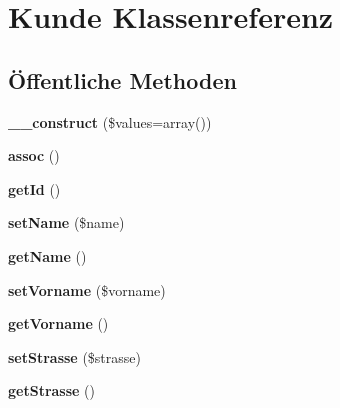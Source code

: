 \hypertarget{classKunde}{\section{\-Kunde \-Klassenreferenz}
\label{classKunde}
}
\subsection*{Öffentliche \-Methoden}
\begin{DoxyCompactItemize}
\item 
\hypertarget{classKunde_ad79f2bdfaefd3925e5f9a06806873223}{{\bfseries \-\_\-\-\_\-construct} (\$values=array())}\label{classKunde_ad79f2bdfaefd3925e5f9a06806873223}

\item 
\hypertarget{classKunde_ad0f0c5c3e3f969484954780af94cedc2}{{\bfseries assoc} ()}\label{classKunde_ad0f0c5c3e3f969484954780af94cedc2}

\item 
\hypertarget{classKunde_a64c93a2695191e9b83aa583d909f89fd}{{\bfseries get\-Id} ()}\label{classKunde_a64c93a2695191e9b83aa583d909f89fd}

\item 
\hypertarget{classKunde_a02d8c41eef3f45e88e873eea36b198e6}{{\bfseries set\-Name} (\$name)}\label{classKunde_a02d8c41eef3f45e88e873eea36b198e6}

\item 
\hypertarget{classKunde_a69a219e35fc80e6a5c2f04fc5e864bdb}{{\bfseries get\-Name} ()}\label{classKunde_a69a219e35fc80e6a5c2f04fc5e864bdb}

\item 
\hypertarget{classKunde_aca1e9d8678ff2ed0bcb1ca192facf41e}{{\bfseries set\-Vorname} (\$vorname)}\label{classKunde_aca1e9d8678ff2ed0bcb1ca192facf41e}

\item 
\hypertarget{classKunde_a6bcdc943abc51661e3a6c035f77bac0b}{{\bfseries get\-Vorname} ()}\label{classKunde_a6bcdc943abc51661e3a6c035f77bac0b}

\item 
\hypertarget{classKunde_aafd468959389eb5b4990d9757f78d6c6}{{\bfseries set\-Strasse} (\$strasse)}\label{classKunde_aafd468959389eb5b4990d9757f78d6c6}

\item 
\hypertarget{classKunde_aa1e2491213b83e4c6682cbcd1b07dd72}{{\bfseries get\-Strasse} ()}\label{classKunde_aa1e2491213b83e4c6682cbcd1b07dd72}


\end{DoxyCompactItemize}
